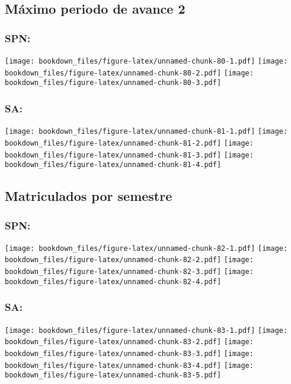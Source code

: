\documentclass[]{article}
\theoremstyle{definition}
\theoremstyle{definition}
\theoremstyle{definition}
\theoremstyle{remark}
\begin{document}
\subsection{Máximo periodo de avance
2}\label{maximo-periodo-de-avance-2}

\subsubsection{SPN:}\label{spn}

\texttt{[image: bookdown\_files/figure-latex/unnamed-chunk-80-1.pdf]}
\texttt{[image: bookdown\_files/figure-latex/unnamed-chunk-80-2.pdf]}
\texttt{[image: bookdown\_files/figure-latex/unnamed-chunk-80-3.pdf]}

\subsubsection{SA:}\label{sa}

\texttt{[image: bookdown\_files/figure-latex/unnamed-chunk-81-1.pdf]}
\texttt{[image: bookdown\_files/figure-latex/unnamed-chunk-81-2.pdf]}
\texttt{[image: bookdown\_files/figure-latex/unnamed-chunk-81-3.pdf]}
\texttt{[image: bookdown\_files/figure-latex/unnamed-chunk-81-4.pdf]}

\subsection{Matriculados por
semestre}\label{matriculados-por-semestre-1}

\subsubsection{SPN:}\label{spn-1}

\texttt{[image: bookdown\_files/figure-latex/unnamed-chunk-82-1.pdf]}
\texttt{[image: bookdown\_files/figure-latex/unnamed-chunk-82-2.pdf]}
\texttt{[image: bookdown\_files/figure-latex/unnamed-chunk-82-3.pdf]}
\texttt{[image: bookdown\_files/figure-latex/unnamed-chunk-82-4.pdf]}

\subsubsection{SA:}\label{sa-1}

\texttt{[image: bookdown\_files/figure-latex/unnamed-chunk-83-1.pdf]}
\texttt{[image: bookdown\_files/figure-latex/unnamed-chunk-83-2.pdf]}
\texttt{[image: bookdown\_files/figure-latex/unnamed-chunk-83-3.pdf]}
\texttt{[image: bookdown\_files/figure-latex/unnamed-chunk-83-4.pdf]}
\texttt{[image: bookdown\_files/figure-latex/unnamed-chunk-83-5.pdf]}
\end{document}
